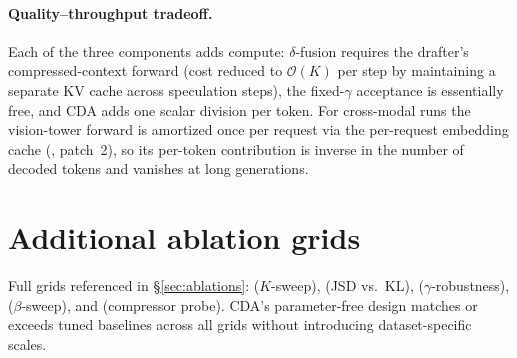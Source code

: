 \documentclass[11pt]{article}
\theoremstyle{plain}
\theoremstyle{definition}
\begin{document}
\paragraph{Quality--throughput tradeoff.}
Each of the three components adds compute: $\delta$-fusion requires the drafter's compressed-context forward (cost reduced to $\mathcal{O}(K)$ per step by maintaining a separate KV cache across speculation steps), the fixed-$\gamma$ acceptance is essentially free, and CDA adds one scalar division per token. For cross-modal runs the vision-tower forward is amortized once per request via the per-request embedding cache (, patch~2), so its per-token contribution is inverse in the number of decoded tokens and vanishes at long generations.

\section{Additional ablation grids}
\label{appx:more-ablations}
Full grids referenced in \S\ref{sec:ablations}:  ($K$-sweep),  (JSD vs.\ KL),  ($\gamma$-robustness),  ($\beta$-sweep), and  (compressor probe). CDA's parameter-free design matches or exceeds tuned baselines across all grids without introducing dataset-specific scales.

\end{document}
